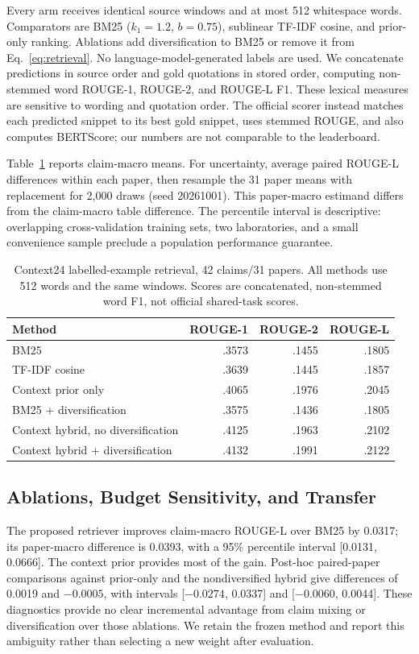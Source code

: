 \documentclass[runningheads]{llncs}
\begin{document}
Every arm receives identical source windows and at most 512 whitespace words. Comparators are BM25 ($k_1=1.2$, $b=0.75$), sublinear TF-IDF cosine, and prior-only ranking. Ablations add diversification to BM25 or remove it from Eq.~\ref{eq:retrieval}. No language-model-generated labels are used. We concatenate predictions in source order and gold quotations in stored order, computing non-stemmed word ROUGE-1, ROUGE-2, and ROUGE-L F1. These lexical measures are sensitive to wording and quotation order. The official scorer instead matches each predicted snippet to its best gold snippet, uses stemmed ROUGE, and also computes BERTScore; our numbers are not comparable to the leaderboard.

Table~\ref{tab:context} reports claim-macro means. For uncertainty, average paired ROUGE-L differences within each paper, then resample the 31 paper means with replacement for 2,000 draws (seed 20261001). This paper-macro estimand differs from the claim-macro table difference. The percentile interval is descriptive: overlapping cross-validation training sets, two laboratories, and a small convenience sample preclude a population performance guarantee.

\begin{table}[t]
\caption{Context24 labelled-example retrieval, 42 claims/31 papers. All methods use 512 words and the same windows. Scores are concatenated, non-stemmed word F1, not official shared-task scores.}
\label{tab:context}
\centering\small
\begin{tabular}{lrrr}
\toprule
Method & ROUGE-1 & ROUGE-2 & ROUGE-L \\
\midrule
BM25 & .3573 & .1455 & .1805 \\
TF-IDF cosine & .3639 & .1445 & .1857 \\
Context prior only & .4065 & .1976 & .2045 \\
BM25 + diversification & .3575 & .1436 & .1805 \\
Context hybrid, no diversification & .4125 & .1963 & .2102 \\
Context hybrid + diversification & .4132 & .1991 & .2122 \\
\bottomrule
\end{tabular}
\end{table}

\subsection{Ablations, Budget Sensitivity, and Transfer}
The proposed retriever improves claim-macro ROUGE-L over BM25 by 0.0317; its paper-macro difference is 0.0393, with a 95\% percentile interval [0.0131, 0.0666]. The context prior provides most of the gain. Post-hoc paired-paper comparisons against prior-only and the nondiversified hybrid give differences of 0.0019 and $-0.0005$, with intervals [$-0.0274$, 0.0337] and [$-0.0060$, 0.0044]. These diagnostics provide no clear incremental advantage from claim mixing or diversification over those ablations. We retain the frozen method and report this ambiguity rather than selecting a new weight after evaluation.
\end{document}
